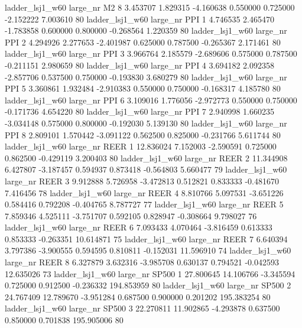     ladder_lsj1_w60   large_nr       M2                 8  3.453707  1.829315  -4.160638 0.550000 0.725000 -2.152222    7.003610 80
    ladder_lsj1_w60   large_nr      PPI                 1  4.746535  2.465470  -1.783858 0.600000 0.800000 -0.268564    1.220359 80
    ladder_lsj1_w60   large_nr      PPI                 2  4.294926  2.277653  -2.401987 0.625000 0.787500 -0.265367    2.171461 80
    ladder_lsj1_w60   large_nr      PPI                 3  3.966764  2.185579  -2.689606 0.575000 0.787500 -0.211151    2.980659 80
    ladder_lsj1_w60   large_nr      PPI                 4  3.694182  2.092358  -2.857706 0.537500 0.750000 -0.193830    3.680279 80
    ladder_lsj1_w60   large_nr      PPI                 5  3.360861  1.932484  -2.910383 0.550000 0.750000 -0.168317    4.185780 80
    ladder_lsj1_w60   large_nr      PPI                 6  3.109016  1.776056  -2.972773 0.550000 0.750000 -0.171736    4.654220 80
    ladder_lsj1_w60   large_nr      PPI                 7  2.940998  1.660235  -3.034148 0.575000 0.800000 -0.192030    5.139130 80
    ladder_lsj1_w60   large_nr      PPI                 8  2.809101  1.570442  -3.091122 0.562500 0.825000 -0.231766    5.611744 80
    ladder_lsj1_w60   large_nr     REER                 1 12.836024  7.152003  -2.590591 0.725000 0.862500 -0.429119    3.200403 80
    ladder_lsj1_w60   large_nr     REER                 2 11.344908  6.427807  -3.187457 0.594937 0.873418 -0.564803    5.660477 79
    ladder_lsj1_w60   large_nr     REER                 3  9.912888  5.726958  -3.472813 0.512821 0.833333 -0.481670    7.416456 78
    ladder_lsj1_w60   large_nr     REER                 4  8.810766  5.097531  -3.651226 0.584416 0.792208 -0.404765    8.787727 77
    ladder_lsj1_w60   large_nr     REER                 5  7.859346  4.525111  -3.751707 0.592105 0.828947 -0.308664    9.798027 76
    ladder_lsj1_w60   large_nr     REER                 6  7.093433  4.070464  -3.816459 0.613333 0.853333 -0.263351   10.614871 75
    ladder_lsj1_w60   large_nr     REER                 7  6.640394  3.797386  -3.900555 0.594595 0.810811 -0.152031   11.596910 74
    ladder_lsj1_w60   large_nr     REER                 8  6.327879  3.632316  -3.985708 0.630137 0.794521 -0.042593   12.635026 73
    ladder_lsj1_w60   large_nr    SP500                 1 27.800645 14.106766  -3.345594 0.725000 0.912500 -0.236332  194.853959 80
    ladder_lsj1_w60   large_nr    SP500                 2 24.767409 12.789670  -3.951284 0.687500 0.900000  0.201202  195.383254 80
    ladder_lsj1_w60   large_nr    SP500                 3 22.270811 11.902865  -4.293878 0.637500 0.850000  0.701838  195.905006 80
